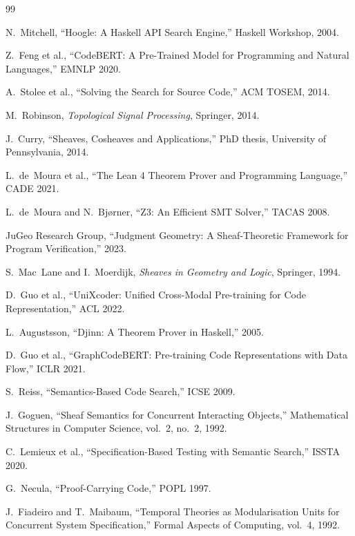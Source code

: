 \documentclass[11pt]{article}
\begin{document}
\begin{thebibliography}{99}

N.~Mitchell, ``Hoogle: A Haskell API Search Engine,'' Haskell Workshop,
2004.

Z.~Feng et al., ``CodeBERT: A Pre-Trained Model for Programming and
Natural Languages,'' EMNLP 2020.

A.~Stolee et al., ``Solving the Search for Source Code,'' ACM TOSEM,
2014.

M.~Robinson, \emph{Topological Signal Processing}, Springer, 2014.

J.~Curry, ``Sheaves, Cosheaves and Applications,'' PhD thesis,
University of Pennsylvania, 2014.

L.~de~Moura et al., ``The Lean 4 Theorem Prover and Programming
Language,'' CADE 2021.

L.~de~Moura and N.~Bj{\o}rner, ``Z3: An Efficient SMT Solver,''
TACAS 2008.

JuGeo Research Group, ``Judgment Geometry: A Sheaf-Theoretic Framework
for Program Verification,'' 2023.

S.~Mac~Lane and I.~Moerdijk, \emph{Sheaves in Geometry and Logic},
Springer, 1994.

D.~Guo et al., ``UniXcoder: Unified Cross-Modal Pre-training for Code
Representation,'' ACL 2022.

L.~Augustsson, ``Djinn: A Theorem Prover in Haskell,'' 2005.

D.~Guo et al., ``GraphCodeBERT: Pre-training Code Representations with
Data Flow,'' ICLR 2021.

S.~Reiss, ``Semantics-Based Code Search,'' ICSE 2009.

J.~Goguen, ``Sheaf Semantics for Concurrent Interacting Objects,''
Mathematical Structures in Computer Science, vol.~2, no.~2, 1992.

C.~Lemieux et al., ``Specification-Based Testing with Semantic Search,''
ISSTA 2020.

G.~Necula, ``Proof-Carrying Code,'' POPL 1997.

J.~Fiadeiro and T.~Maibaum, ``Temporal Theories as Modularisation
Units for Concurrent System Specification,'' Formal Aspects of
Computing, vol.~4, 1992.


\end{thebibliography}
\end{document}

